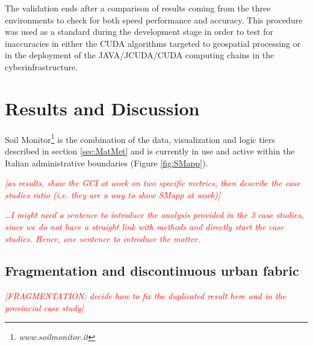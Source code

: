 \documentclass[APA,LATO1COL,doublespace]{WileyNJD-v2}
\newcommand{\toberevised}[1]{\emph{\textcolor{red}{#1}}} %
\begin{document}
The validation ends after a comparison of results coming from the three environments to check for both speed performance and accuracy. 
This procedure was used as a standard during the development stage in order to test for inaccuracies in either the CUDA algorithms targeted to geospatial processing or in the deployment of the JAVA/JCUDA/CUDA computing chains in the cyberinfrastructure.

\section{ Results and Discussion } %
\label{sec:results}
Soil Monitor\footnote{\emph{www.soilmonitor.it}} is the combination of the data, visualization and logic tiers described in section \ref{sec:MatMet} and is currently in use and active within the Italian administrative boundaries (Figure \ref{fig:SMapp}).



\toberevised{[as results, show the GCI at work on two specific metrics, then describe the case studies ratio (i.e. they are a way to show SMapp at work)]}

\toberevised{ \ldots I might need a sentence to introduce the analysis provided in the 3 case studies, since we do not have a straight link with methods and directly start the case studies. Hence, one sentence to introduce the matter. }


\subsection{ Fragmentation and discontinuous urban fabric }
\toberevised{[FRAGMENTATION: decide how to fix the duplicated result here and in the provincial case study]}
\end{document}
